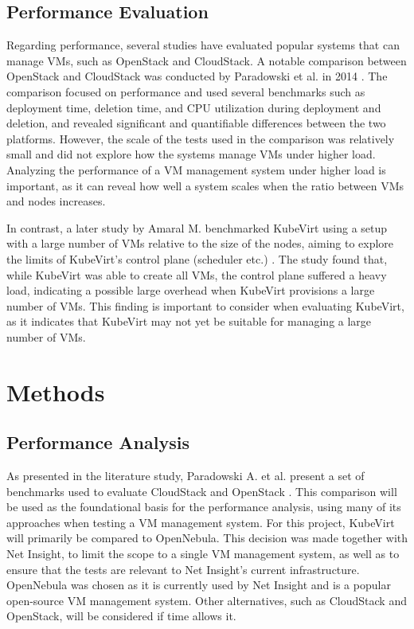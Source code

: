 \documentclass{article}
\begin{document}
\subsection{Performance Evaluation}
Regarding performance, several studies have evaluated popular systems that can manage VMs, such as OpenStack and CloudStack. A notable comparison between OpenStack and CloudStack was conducted by Paradowski et al. in 2014 \cite{cs-os-benchmark}. The comparison focused on performance and used several benchmarks such as deployment time, deletion time, and CPU utilization during deployment and deletion, and revealed significant and quantifiable differences between the two platforms. However, the scale of the tests used in the comparison was relatively small and did not explore how the systems manage VMs under higher load. Analyzing the performance of a VM management system under higher load is important, as it can reveal how well a system scales when the ratio between VMs and nodes increases. 

In contrast, a later study by Amaral M. benchmarked KubeVirt using a setup with a large number of VMs relative to the size of the nodes, aiming to explore the limits of KubeVirt's control plane (scheduler etc.) \cite{ibm-kubevirt-scale}. The study found that, while KubeVirt was able to create all VMs, the control plane suffered a heavy load, indicating a possible large overhead when KubeVirt provisions a large number of VMs. This finding is important to consider when evaluating KubeVirt, as it indicates that KubeVirt may not yet be suitable for managing a large number of VMs.

\newpage
\section{Methods}
\subsection{Performance Analysis}
As presented in the literature study, Paradowski A. et al. present a set of benchmarks used to evaluate CloudStack and OpenStack \cite{cs-os-benchmark}. This comparison will be used as the foundational basis for the performance analysis, using many of its approaches when testing a VM management system. For this project, KubeVirt will primarily be compared to OpenNebula. This decision was made together with Net Insight, to limit the scope to a single VM management system, as well as to ensure that the tests are relevant to Net Insight's current infrastructure. OpenNebula was chosen as it is currently used by Net Insight and is a popular open-source VM management system. Other alternatives, such as CloudStack and OpenStack, will be considered if time allows it. 
\end{document}
